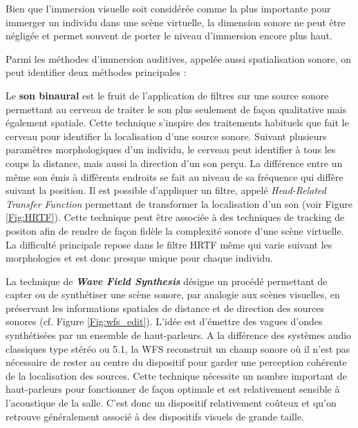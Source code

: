 Bien que l'immersion visuelle soit considérée comme la plus importante pour immerger un individu dans une scène virtuelle, la dimension sonore ne peut être négligée et permet souvent de porter le niveau d'immersion encore plus haut.

Parmi les méthodes d'immersion auditives, appelée aussi spatialisation sonore, on peut identifier deux méthodes principales :

Le \textbf{son binaural} est le fruit de l'application de filtres sur une source sonore permettant au cerveau de traiter le son plus seulement de façon qualitative mais également spatiale. Cette technique s'inspire des traitements habituels que fait le cerveau pour identifier la localisation d'une source sonore. Suivant plusieurs paramètres morphologiques d'un individu, le cerveau peut identifier à tous les coups la distance, mais aussi la direction d'un son perçu. La différence entre un même son émis à différents endroits se fait au niveau de sa fréquence qui diffère suivant la position. Il est possible d'appliquer un filtre, appelé \textit{Head-Related Transfer Function} permettant de transformer la localisation d'un son (voir Figure \ref{Fig:HRTF}). Cette technique peut être associée à des techniques de tracking de positon afin de rendre de façon fidèle la complexité sonore d'une scène virtuelle. La difficulté principale repose dans le filtre HRTF même qui varie suivant les morphologies et est donc presque unique pour chaque individu.

La technique de \textit{\textbf{Wave Field Synthesis}} désigne un procédé permettant de capter ou de synthétiser une scène sonore, par analogie aux scènes visuelles, en préservant les informations spatiales de distance et de direction des sources sonores (cf. Figure \ref{Fig:wfs_edit}). L'idée est d'émettre des vagues d'ondes synthétisées par un ensemble de haut-parleurs. A la différence des systèmes audio classiques type stéréo ou 5.1, la WFS reconstruit un champ sonore où il n'est pas nécessaire de rester au centre du dispositif pour garder une perception cohérente de la localisation des sources.
Cette technique nécessite un nombre important de haut-parleurs pour fonctionner de façon optimale et est relativement sensible à l'acoustique de la salle. C'est donc un dispositif relativement coûteux et qu'on retrouve généralement associé à des dispositifs visuels de grande taille.

